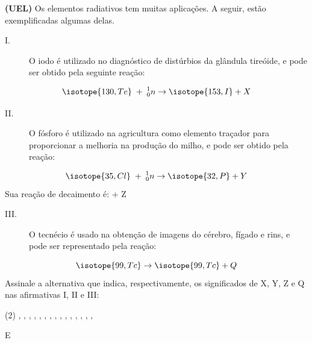 \documentclass[9 pt]{scrartcl}
\def\PQ{0.84} %
\begin{document}
\begin{exercise}[points=\PQ]
\textbf{(UEL)} Os elementos radiativos tem muitas aplicações. A seguir, estão exemplificadas algumas delas.

\begin{description}
\item[{I.}] O iodo é utilizado no diagnóstico de distúrbios da glândula tireóide, e pode ser obtido pela seguinte reação:
\end{description}
\begin{equation*}
\isotope{130,Te} \;  + \; _{0}^{1}n \rightarrow \isotope{153,I} + X
\end{equation*}
\begin{description}
\item[{II.}] O fósforo é utilizado na agricultura como elemento traçador para proporcionar a melhoria na produção do milho, e pode ser obtido pela reação:
\end{description}
\begin{equation*}
\isotope{35,Cl}\; +\; _{0}^{1}n \rightarrow \isotope{32,P} + Y
\end{equation*}
Sua reação de decaimento é:  \ch{->}  + Z
\begin{description}
\item[{III.}] O tecnécio é usado na obtenção de imagens do cérebro, fígado e rins, e pode ser representado pela reação:
\end{description}
\begin{equation*}
\isotope{99,Tc}  \rightarrow \isotope{99,Tc} + Q
\end{equation*}
Assinale a alternativa que indica, respectivamente, os significados de X, Y, Z e Q nas afirmativas I, II e III:

\begin{choice}(2)
\choice \upalpha, \upbeta, \upgamma, \upalpha
\choice \upalpha, \upbeta, \upalpha, \upgamma
\choice \upgamma, \upbeta, \upgamma, \upalpha
\choice \upbeta, \upalpha, \upbeta, \upbeta
\choice \upbeta, \upalpha, \upbeta, \upgamma
\end{choice}
\end{exercise}
\begin{solution}
E
\end{solution}





\end{document}
